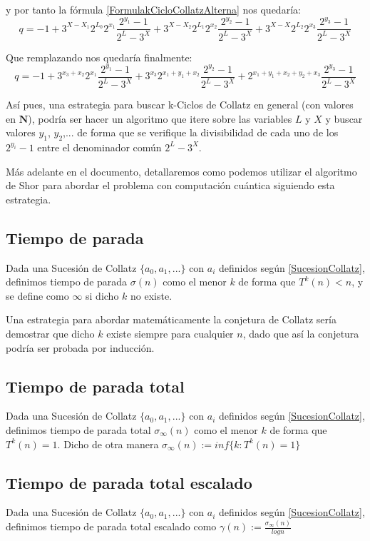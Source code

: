 y por tanto la fórmula \ref{FormulakCicloCollatzAlterna} nos quedaría:
$$q = -1 + 3^{X-X_1}2^{L_0}2^{x_1}\frac{2^{y_1}-1}{2^L-3^X} + 3^{X-X_2}2^{L_1}2^{x_2}\frac{2^{y_2}-1}{2^L-3^X} + 3^{X-X}2^{L_2}2^{x_3}\frac{2^{y_3}-1}{2^L-3^X}$$

Que remplazando nos quedaría finalmente:
$$q = -1 + 3^{x_3+x_2}2^{x_1}\frac{2^{y_1}-1}{2^L-3^X} + 3^{x_3}2^{x_1+y_1+x_2}\frac{2^{y_2}-1}{2^L-3^X} + 2^{x_1+y_1+x_2+y_2+x_3}\frac{2^{y_3}-1}{2^L-3^X}$$

Así pues, una estrategia para buscar k-Ciclos de Collatz en general (con valores en $\mathbf{N}$), podría ser hacer un algoritmo que itere sobre las variables $L$ y $X$ y buscar valores $y_1$, $y_2$,... de forma que se verifique la divisibilidad de cada uno de los $2^{y_i}-1$ entre el denominador común $2^L-3^X$.

Más adelante en el documento, detallaremos como podemos utilizar el algoritmo de Shor para abordar el problema con computación cuántica siguiendo esta estrategia.




\subsection{Tiempo de parada}
Dada una Sucesión de Collatz $\{a_0, a_1, ...\}$ con $a_i$ definidos según \ref{SucesionCollatz}, definimos tiempo de parada $\sigma(n)$ como el menor $k$ de forma que $T^k(n)<n$, y se define como $\infty$ si dicho $k$ no existe.

Una estrategia para abordar matemáticamente la conjetura de Collatz sería demostrar que dicho $k$ existe siempre para cualquier $n$, dado que así la conjetura podría ser probada por inducción.




\subsection{Tiempo de parada total}
Dada una Sucesión de Collatz $\{a_0, a_1, ...\}$ con $a_i$ definidos según \ref{SucesionCollatz}, definimos tiempo de parada total $\sigma_{\infty}(n)$ como el menor $k$ de forma que $T^k(n)=1$.
Dicho de otra manera $\sigma_{\infty}(n):= inf\{ k: T^k(n) = 1\}$



\subsection{Tiempo de parada total escalado}
Dada una Sucesión de Collatz $\{a_0, a_1, ...\}$ con $a_i$ definidos según \ref{SucesionCollatz}, definimos tiempo de parada total escalado como $\gamma(n):=\frac{\sigma_{\infty}(n)}{log n}$



